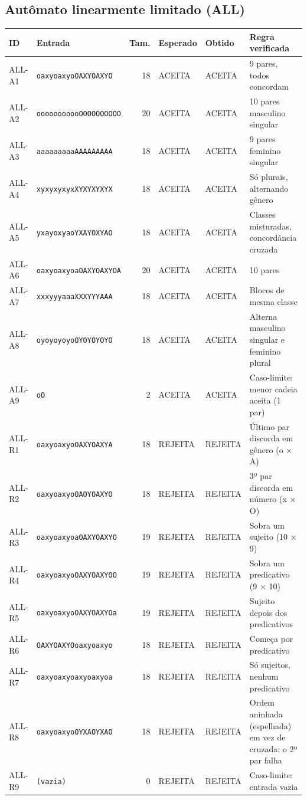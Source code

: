 \subsection*{Autômato linearmente limitado (ALL)}
{\footnotesize\setlength{\tabcolsep}{3pt}\begin{longtable}{l p{4cm} r p{2cm} p{2cm} p{3.8cm}}
\textbf{ID} & \textbf{Entrada} & \textbf{Tam.} & \textbf{Esperado} & \textbf{Obtido} & \textbf{Regra verificada} \\ \hline \endhead
ALL-A1 & \texttt{oaxyoaxyoOAXYOAXYO} & 18 & ACEITA & ACEITA & 9 pares, todos concordam \\
ALL-A2 & \texttt{ooooooooooOOOOOOOOOO} & 20 & ACEITA & ACEITA & 10 pares masculino singular \\
ALL-A3 & \texttt{aaaaaaaaaAAAAAAAAA} & 18 & ACEITA & ACEITA & 9 pares feminino singular \\
ALL-A4 & \texttt{xyxyxyxyxXYXYXYXYX} & 18 & ACEITA & ACEITA & Só plurais, alternando gênero \\
ALL-A5 & \texttt{yxayoxyaoYXAYOXYAO} & 18 & ACEITA & ACEITA & Classes misturadas, concordância cruzada \\
ALL-A6 & \texttt{oaxyoaxyoaOAXYOAXYOA} & 20 & ACEITA & ACEITA & 10 pares \\
ALL-A7 & \texttt{xxxyyyaaaXXXYYYAAA} & 18 & ACEITA & ACEITA & Blocos de mesma classe \\
ALL-A8 & \texttt{oyoyoyoyoOYOYOYOYO} & 18 & ACEITA & ACEITA & Alterna masculino singular e feminino plural \\
ALL-A9 & \texttt{oO} & 2 & ACEITA & ACEITA & Caso-limite: menor cadeia aceita (1 par) \\
ALL-R1 & \texttt{oaxyoaxyoOAXYOAXYA} & 18 & REJEITA & REJEITA & Último par discorda em gênero (o $\times$ A) \\
ALL-R2 & \texttt{oaxyoaxyoOAOYOAXYO} & 18 & REJEITA & REJEITA & 3º par discorda em número (x $\times$ O) \\
ALL-R3 & \texttt{oaxyoaxyoaOAXYOAXYO} & 19 & REJEITA & REJEITA & Sobra um sujeito (10 $\times$ 9) \\
ALL-R4 & \texttt{oaxyoaxyoOAXYOAXYOO} & 19 & REJEITA & REJEITA & Sobra um predicativo (9 $\times$ 10) \\
ALL-R5 & \texttt{oaxyoaxyoOAXYOAXYOa} & 19 & REJEITA & REJEITA & Sujeito depois dos predicativos \\
ALL-R6 & \texttt{OAXYOAXYOoaxyoaxyo} & 18 & REJEITA & REJEITA & Começa por predicativo \\
ALL-R7 & \texttt{oaxyoaxyoaxyoaxyoa} & 18 & REJEITA & REJEITA & Só sujeitos, nenhum predicativo \\
ALL-R8 & \texttt{oaxyoaxyoOYXAOYXAO} & 18 & REJEITA & REJEITA & Ordem aninhada (espelhada) em vez de cruzada: o 2º par falha \\
ALL-R9 & \texttt{(vazia)} & 0 & REJEITA & REJEITA & Caso-limite: entrada vazia \\
\end{longtable}}
